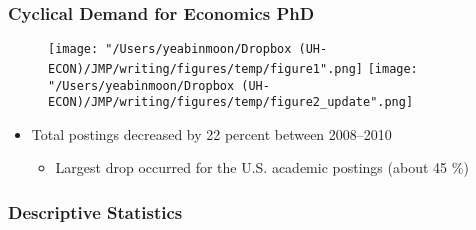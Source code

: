 \documentclass[11pt]{beamer}
\begin{document}
\begin{frame}
	\frametitle{Cyclical Demand for Economics PhD}

\begin{figure}
	\centering
\texttt{[image: "/Users/yeabinmoon/Dropbox (UH-ECON)/JMP/writing/figures/temp/figure1".png]} 
\texttt{[image: "/Users/yeabinmoon/Dropbox (UH-ECON)/JMP/writing/figures/temp/figure2\_update".png]} 
\end{figure}
			
\begin{itemize}	
\item Total postings decreased by 22 percent between 2008--2010
\begin{itemize}
	\item Largest drop occurred for the U.S. academic postings (about 45 \%)
\end{itemize}
\end{itemize}
\end{frame}



\begin{frame}
	\frametitle{Descriptive Statistics}
	
\end{frame}
\end{document}
